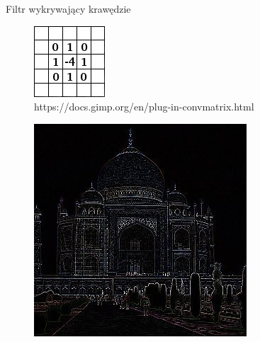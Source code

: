 \documentclass[xcolor=dvipsnames]{beamer}
\begin{document}
\begin{frame}{Filtr wykrywający krawędzie}
	\begin{minipage}[t]{0.3\linewidth}
		\vfill
		\begin{figure}
			\includegraphics[width=\linewidth]{img/convolution-edge-detect.png}
			\caption{https://docs.gimp.org/en/plug-in-convmatrix.html}
		\end{figure}	
	\end{minipage}%
	\hfill
	\begin{minipage}[t]{0.6\linewidth}
		\vfill
		\begin{figure}
			\includegraphics[width=\linewidth, height=0.7\textheight, keepaspectratio] {img/taj-edge-detect.jpg}

\end{figure}
\end{minipage}
\end{frame}
\end{document}
